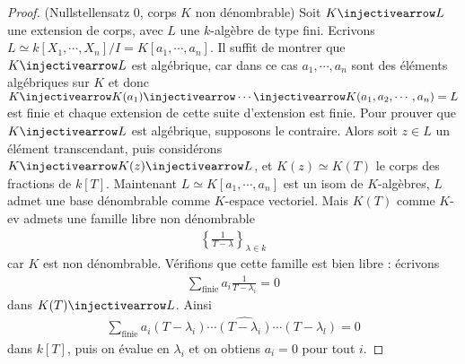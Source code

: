             \begin{proof} (Nullstellensatz 0, corps $K$ non dénombrable)
                Soit $K \injectivearrow L$ une extension de corps, avec $L$ une $k$-algèbre de type fini. Ecrivons $L \simeq k[X_1, \cdots, X_n] / I = K[a_1, \cdots, a_n]$. Il suffit de montrer que $K \injectivearrow L$ est algébrique, car dans ce cas $a_1, \cdots, a_n$ sont des éléments algébriques sur $K$ et donc $K \injectivearrow K(a_1) \injectivearrow \cdots \injectivearrow K(a_1, a_2, \cdots, a_n) = L$ est finie et chaque extension de cette suite d'extension est finie. Pour prouver que $K \injectivearrow L$ est algébrique, supposons le contraire. Alors soit $z \in L$ un élément transcendant, puis considérons $K \injectivearrow K(z) \injectivearrow L$, et $K(z) \simeq K(T)$ le corps des fractions de $k[T]$. Maintenant $L \simeq K[a_1, \cdots, a_n]$ est un isom de $K$-algèbres, $L$ admet une base dénombrable comme $K$-espace vectoriel. Mais $K(T)$ comme $K$-ev admets une famille libre non dénombrable
                \begin{align*}
                    \left\{ \frac{1}{T - \lambda} \right\}_{\lambda \in k}
                \end{align*}
                car $K$ est non dénombrable. Vérifions que cette famille est bien libre : écrivons
                \begin{align*}
                    \sum_{\mathrm{finie}} a_i \frac{1}{T - \lambda_i} = 0
                \end{align*}
                dans $K(T) \injectivearrow L$. Ainsi
                \begin{align*}
                    \sum_{\mathrm{finie}} a_i (T - \lambda_i) \cdots \widehat{(T - \lambda_i)} \cdots (T - \lambda_l) = 0
                \end{align*}
                dans $k[T]$, puis on évalue en $\lambda_i$ et on obtiens $a_i = 0$ pour tout $i$.
            \end{proof}

